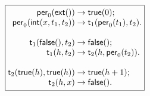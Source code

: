 \documentclass[11pt]{article}
\begin{document}
\TeXtoEPS
\(
\boxed{
\begin{array}{@{}r@{\;}c@{\;}l@{}}
\fun{per}_0(\fun{ext}()) & \rightarrow & \fun{true}(0);\\
\fun{per}_0(\fun{int}(x,t_1,t_2)) & \rightarrow &
  \fun{t}_1(\fun{per}_0(t_1),t_2).\\
\\
\fun{t}_1(\fun{false}(),t_2) & \rightarrow & \fun{false}();\\
\fun{t}_1(h,t_2) & \rightarrow & \fun{t}_2(h,\fun{per}_0(t_2)).\\
\\
\fun{t}_2(\fun{true}(h),\fun{true}(h)) & \rightarrow & \fun{true}(h+1);\\
\fun{t}_2(h,x) & \rightarrow & \fun{false}().
\end{array}}
\)
\endTeXtoEPS
\end{document}
